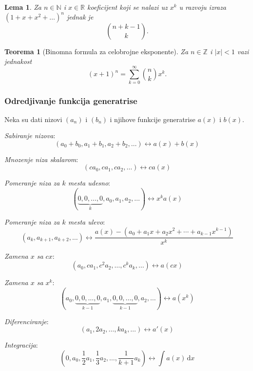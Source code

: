 \documentclass[12p, a4paper]{article}
\newtheorem*{theorem}{Teorema}
\newtheorem*{lema}{Lema}
\begin{document}
\begin{multicols}{2}
    \begin{lema}
        Za $n \in \mathbb{N}$ i $x \in \mathbb{R}$ koeficijent koji se 
        nalazi uz $x^k$ u razvoju izraza ${(1 + x + x^2 + \ldots)}^n$ 
        jednak je
        \[
            \binom{n + k - 1}{k}.
        \]
    \end{lema}

    \begin{theorem}[Binomna formula za celobrojne eksponente]
        Za $n \in \mathbb{Z}$ i $|x| < 1$ vazi jednakost
        \[
            {(x + 1)}^n = \sum_{k = 0}^\infty \binom{n}{k} x^k.
        \]
    \end{theorem}

    \subsubsection{Odredjivanje funkcija generatrise}
    
    Neka su dati nizovi $(a_n)$ i $(b_n)$ i njihove funkcije generatrise 
    $a(x)$ i $b(x)$.

    \emph{Sabiranje nizova}: 
    \[
        (a_0 + b_0, a_1 + b_1, a_2 + b_2, \ldots) \leftrightarrow a(x) + b(x)
    \]

    \emph{Mnozenje niza skalarom}:
    \[
        (c a_0, c a_1, c a_2, \ldots) \leftrightarrow c a(x)
    \]

    \emph{Pomeranje niza za $k$ mesta udesno}:
    \[
        (\underbrace{0, 0, \ldots, 0}_k, a_0, a_1, a_2, \ldots) \leftrightarrow
        x^k a(x)
    \]

    \emph{Pomeranje niza za $k$ mesta ulevo}:
    \[
        (a_k, a_{k + 1}, a_{k + 2}, \ldots) \leftrightarrow 
        \frac{a(x) - (a_0 + a_1 x + a_2 x^2 + \cdots + a_{k - 1} x^{k - 1})}
        {x^k}
    \]

    \emph{Zamena $x$ sa $c x$}:
    \[
        (a_0, c a_1, c^2 a_2, \ldots, c^k a_k, \ldots) \leftrightarrow a(c x)
    \]

    \emph{Zamena $x$ sa $x^k$}: 
    \[
        (a_0, \underbrace{0, 0, \ldots, 0}_{k - 1}, a_1, 
        \underbrace{0, 0, \ldots, 0}_{k - 1}, a_2, \ldots) \leftrightarrow 
        a(x^k)
    \]

    \emph{Diferenciranje}:
    \[
        (a_1, 2 a_2, \ldots, k a_k, \ldots) \leftrightarrow a'(x)
    \]

    \emph{Integracija}:
    \[
        (0, a_0, \frac{1}{2} a_1, \frac{1}{3} a_2, \ldots, 
        \frac{1}{k + 1} a_k) \leftrightarrow \int a(x)\, \mathrm{d} x
    \]


\end{multicols}
\end{document}
